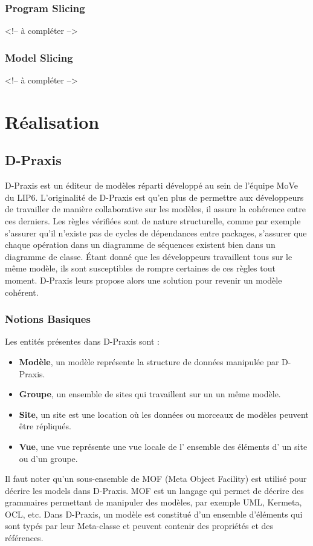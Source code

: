\documentclass[a4paper,14pt]{article}
\begin{document}
\subsubsection{Program Slicing}
<!-- à compléter -->
\subsubsection{Model Slicing}
<!-- à compléter -->
\section{Réalisation}
\subsection{D-Praxis}
D-Praxis est un éditeur de modèles réparti développé au sein de l'équipe MoVe du LIP6. L'originalité de D-Praxis est qu'en plus de permettre aux développeurs de travailler de manière collaborative sur les modèles, il assure la cohérence entre ces derniers. Les règles vérifiées sont de nature structurelle, comme par exemple s'assurer qu'il n'existe pas de cycles de dépendances entre packages, s'assurer que chaque opération dans un diagramme de séquences existent bien dans un diagramme de classe. Étant donné que les développeurs travaillent tous sur le même modèle, ils sont susceptibles de rompre certaines de ces règles  tout moment. D-Praxis leurs propose alors une solution pour revenir  un modèle cohérent.
\subsubsection{Notions Basiques}
Les entités présentes dans D-Praxis sont :
\begin{itemize}
\item \textbf{Modèle},  un modèle représente la structure de données manipulée par D-Praxis.
\item \textbf{Groupe}, un ensemble de sites qui travaillent sur un un même modèle.
\item \textbf{Site}, un site est une location  où les données ou morceaux de modèles peuvent être répliqués.
\item \textbf{Vue}, une vue représente une vue locale de l' ensemble des éléments d' un site ou  d'un groupe.
\end{itemize}
Il faut noter qu'un sous-ensemble de MOF (Meta Object Facility) est utilisé pour décrire les models dans D-Praxis. MOF est un langage qui permet de décrire des grammaires permettant de manipuler des modèles, par exemple UML, Kermeta, OCL, etc. Dans D-Praxis, un modèle est constitué d'un ensemble d'éléments qui sont typés par leur Meta-classe et peuvent contenir des propriétés et des références.
\end{document}
